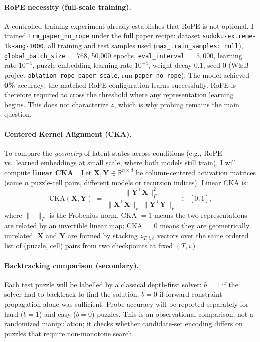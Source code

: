 \documentclass{article}
\begin{document}
\paragraph{RoPE necessity (full-scale training).}  A controlled training experiment already establishes that RoPE is not optional.  I trained \texttt{trm\_paper\_no\_rope} under the full paper recipe: dataset \texttt{sudoku-extreme-1k-aug-1000}, all training and test samples used (\texttt{max\_train\_samples: null}), \texttt{global\_batch\_size} $=768$, 50{,}000 epochs, \texttt{eval\_interval} $=5{,}000$, learning rate $10^{-4}$, puzzle embedding learning rate $10^{-4}$, weight decay $0.1$, seed $0$ (W\&B project \texttt{ablation-rope-paper-scale}, run \texttt{paper-no-rope}).  The model achieved \textbf{0\%} accuracy; the matched RoPE configuration learns successfully.  RoPE is therefore required to cross the threshold where any representation learning begins.  This does not characterize $z$, which is why probing remains the main question.

\paragraph{Centered Kernel Alignment (CKA).}  To compare the \textit{geometry} of latent states across conditions (e.g., RoPE vs.\ learned embeddings at small scale, where both models still train), I will compute \textbf{linear CKA}~\cite{kornblith2019similarity}.  Let $\mathbf{X}, \mathbf{Y} \in \mathbb{R}^{n \times d}$ be column-centered activation matrices (same $n$ puzzle-cell pairs, different models or recursion indices).  Linear CKA is:
\begin{equation}
\label{eq:cka}
\mathrm{CKA}(\mathbf{X}, \mathbf{Y}) \;=\; \frac{\bigl\| \mathbf{Y}^{\top} \mathbf{X} \bigr\|_{F}^{2}}{\bigl\| \mathbf{X}^{\top} \mathbf{X} \bigr\|_{F} \, \bigl\| \mathbf{Y}^{\top} \mathbf{Y} \bigr\|_{F}} \;\in\; [0,1]\text{,}
\end{equation}
where $\|\cdot\|_{F}$ is the Frobenius norm.  CKA $=1$ means the two representations are related by an invertible linear map; CKA $=0$ means they are geometrically unrelated.  $\mathbf{X}$ and $\mathbf{Y}$ are formed by stacking $z_{T,i,c}$ vectors over the same ordered list of (puzzle, cell) pairs from two checkpoints at fixed $(T,i)$.

\paragraph{Backtracking comparison (secondary).}  Each test puzzle will be labelled by a classical depth-first solver: $b=1$ if the solver had to backtrack to find the solution, $b=0$ if forward constraint propagation alone was sufficient.  Probe accuracy will be reported separately for hard ($b=1$) and easy ($b=0$) puzzles.  This is an observational comparison, not a randomized manipulation; it checks whether candidate-set encoding differs on puzzles that require non-monotone search.
\end{document}
